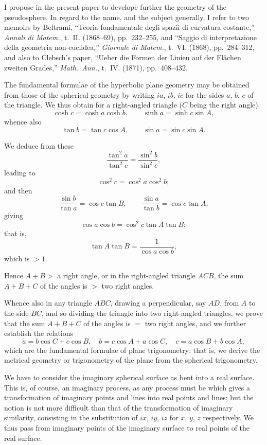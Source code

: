 \documentclass[11pt,a4paper]{book}
\begin{document}
\begin{art}
I propose in the present paper to develope further the geometry of the pseudosphere. In regard to the name, and the subject generally, I refer to two memoirs by Beltrami, ``Teoria fondamentale degli spazii di curvatura costante,'' \textit{Annali di Matem.}, t.~II. (1868--69), pp.~232--255, and ``Saggio di interpretazione della geometria non-euclidea,'' \textit{Giornale di Matem.}, t.~VI. (1868), pp.~284--312, and also to Clebsch's paper, ``Ueber die Formen der Linien auf der Fl\"achen zweiten Grades,'' \textit{Math.~Ann.}, t.~IV. (1871), pp.~408--432.
\end{art}

\begin{art}
The fundamental formulae of the hyperbolic plane geometry may be obtained from those of the spherical geometry by writing $ia$, $ib$, $ic$ for the sides $a$, $b$, $c$ of the triangle. We thus obtain for a right-angled triangle ($C$ being the right angle)
\[
\cosh c = \cosh a \cosh b, \qquad \sinh a = \sinh c \sin A,
\]
whence also
\[
\tan b = \tan c \cos A, \qquad \sin a = \sin c \sin A.
\]
\end{art}

\begin{art}
We deduce from these
\[
\frac{\tan^2 a}{\tan^2 c} = \frac{\sin^2 b}{\sin^2 c},
\]
leading to
\[
\cos^2 c = \cos^2 a \cos^2 b;
\]
and then
\[
\frac{\sin b}{\tan a} = \cos c \tan B, \qquad \frac{\sin a}{\tan b} = \cos c \tan A,
\]
giving
\[
\cos a \cos b = \cos^2 c \tan A \tan B;
\]
that is,
\[
\tan A \tan B = \frac{1}{\cos a \cos b},
\]
which is $> 1$.

Hence $A + B >$ a right angle, or in the right-angled triangle $ACB$, the sum $A + B + C$ of the angles is $>$ two right angles.
\end{art}

\begin{art}
Whence also in any triangle $ABC$, drawing a perpendicular, say $AD$, from $A$ to the side $BC$, and so dividing the triangle into two right-angled triangles, we prove that the sum $A + B + C$ of the angles is $=$ two right angles, and we further establish the relations
\[
a = b\cos C + c\cos B, \quad b = c\cos A + a\cos C, \quad c = a\cos B + b\cos A,
\]
which are the fundamental formulae of plane trigonometry; that is, we derive the metrical geometry or trigonometry of the plane from the spherical trigonometry.
\end{art}

\begin{art}
We have to consider the imaginary spherical surface as bent into a real surface. This is, of course, an imaginary process, as any process must be which gives a transformation of imaginary points and lines into real points and lines; but the notion is not more difficult than that of the transformation of imaginary similarity, consisting in the substitution of $ix$, $iy$, $iz$ for $x$, $y$, $z$ respectively. We thus pass from imaginary points of the imaginary surface to real points of the real surface.
\end{art}
\end{document}
